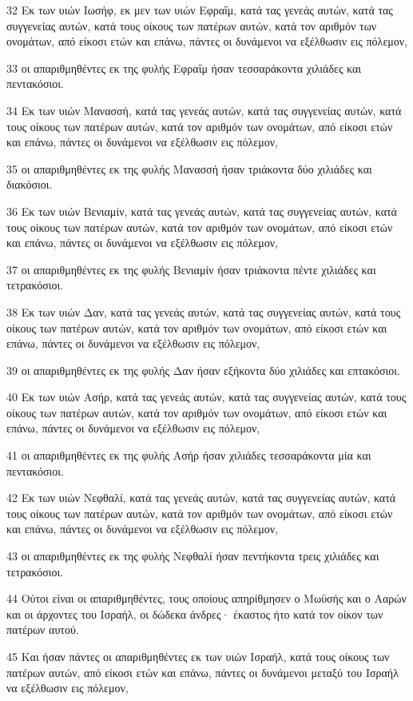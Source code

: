 \par 32 Εκ των υιών Ιωσήφ, εκ μεν των υιών Εφραΐμ, κατά τας γενεάς αυτών, κατά τας συγγενείας αυτών, κατά τους οίκους των πατέρων αυτών, κατά τον αριθμόν των ονομάτων, από είκοσι ετών και επάνω, πάντες οι δυνάμενοι να εξέλθωσιν εις πόλεμον,
\par 33 οι απαριθμηθέντες εκ της φυλής Εφραΐμ ήσαν τεσσαράκοντα χιλιάδες και πεντακόσιοι.
\par 34 Εκ των υιών Μανασσή, κατά τας γενεάς αυτών, κατά τας συγγενείας αυτών, κατά τους οίκους των πατέρων αυτών, κατά τον αριθμόν των ονομάτων, από είκοσι ετών και επάνω, πάντες οι δυνάμενοι να εξέλθωσιν εις πόλεμον,
\par 35 οι απαριθμηθέντες εκ της φυλής Μανασσή ήσαν τριάκοντα δύο χιλιάδες και διακόσιοι.
\par 36 Εκ των υιών Βενιαμίν, κατά τας γενεάς αυτών, κατά τας συγγενείας αυτών, κατά τους οίκους των πατέρων αυτών, κατά τον αριθμόν των ονομάτων, από είκοσι ετών και επάνω, πάντες οι δυνάμενοι να εξέλθωσιν εις πόλεμον,
\par 37 οι απαριθμηθέντες εκ της φυλής Βενιαμίν ήσαν τριάκοντα πέντε χιλιάδες και τετρακόσιοι.
\par 38 Εκ των υιών Δαν, κατά τας γενεάς αυτών, κατά τας συγγενείας αυτών, κατά τους οίκους των πατέρων αυτών, κατά τον αριθμόν των ονομάτων, από είκοσι ετών και επάνω, πάντες οι δυνάμενοι να εξέλθωσιν εις πόλεμον,
\par 39 οι απαριθμηθέντες εκ της φυλής Δαν ήσαν εξήκοντα δύο χιλιάδες και επτακόσιοι.
\par 40 Εκ των υιών Ασήρ, κατά τας γενεάς αυτών, κατά τας συγγενείας αυτών, κατά τους οίκους των πατέρων αυτών, κατά τον αριθμόν των ονομάτων, από είκοσι ετών και επάνω, πάντες οι δυνάμενοι να εξέλθωσιν εις πόλεμον,
\par 41 οι απαριθμηθέντες εκ της φυλής Ασήρ ήσαν χιλιάδες τεσσαράκοντα μία και πεντακόσιοι.
\par 42 Εκ των υιών Νεφθαλί, κατά τας γενεάς αυτών, κατά τας συγγενείας αυτών, κατά τους οίκους των πατέρων αυτών, κατά τον αριθμόν των ονομάτων, από είκοσι ετών και επάνω, πάντες οι δυνάμενοι να εξέλθωσιν εις πόλεμον,
\par 43 οι απαριθμηθέντες εκ της φυλής Νεφθαλί ήσαν πεντήκοντα τρεις χιλιάδες και τετρακόσιοι.
\par 44 Ούτοι είναι οι απαριθμηθέντες, τους οποίους απηρίθμησεν ο Μωϋσής και ο Ααρών και οι άρχοντες του Ισραήλ, οι δώδεκα άνδρες· έκαστος ήτο κατά τον οίκον των πατέρων αυτού.
\par 45 Και ήσαν πάντες οι απαριθμηθέντες εκ των υιών Ισραήλ, κατά τους οίκους των πατέρων αυτών, από είκοσι ετών και επάνω, πάντες οι δυνάμενοι μεταξύ του Ισραήλ να εξέλθωσιν εις πόλεμον,
